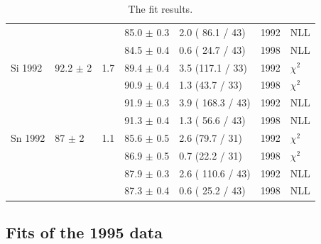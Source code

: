 \begin{table}[H]
\begin{center}
\begin{tabular}{|l||l|l|l|l|l|l|}
                 &                &     & 85.0 $\pm$ 0.3 & 2.0 ( 86.1 / 43) & 1992 & NLL \\
                 &                &     & 84.5 $\pm$ 0.4 & 0.6 ( 24.7 / 43) & 1998 & NLL \\
      \hline                           
       Si 1992   & 92.2 $\pm$ 2   & 1.7 & 89.4 $\pm$ 0.4 & 3.5 (117.1 / 33) & 1992 & $\chi^2$ \\  
                 &                &     & 90.9 $\pm$ 0.4 & 1.3 (43.7 / 33)  & 1998 & $\chi^2$ \\  
                                        
                 &                &     & 91.9 $\pm$ 0.3 & 3.9 ( 168.3 / 43) & 1992 & NLL \\
                 &                &     & 91.3 $\pm$ 0.4 & 1.3 ( 56.6 / 43) & 1998 & NLL \\
      \hline                           
       Sn 1992   & 87   $\pm$ 2   & 1.1 & 85.6 $\pm$ 0.5 & 2.6 (79.7 / 31)  & 1992 & $\chi^2$ \\  
                 &                &     & 86.9 $\pm$ 0.5 & 0.7 (22.2 / 31)  & 1998 & $\chi^2$ \\  
                                        
                 &                &     & 87.9 $\pm$ 0.3 & 2.6 ( 110.6 / 43) & 1992 & NLL \\
                 &                &     & 87.3 $\pm$ 0.4 & 0.6 ( 25.2 / 43) & 1998 & NLL \\
      \hline                           
    \end{tabular}
  \end{center}
  \caption{The fit results.}
  \label{table:fits1992}
\end{table}

\subsection { Fits of the 1995 data }

